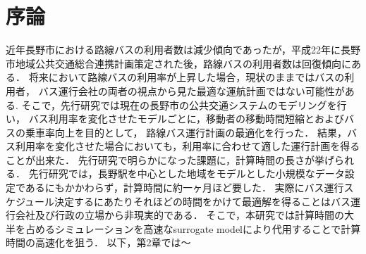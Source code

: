 \documentclass[main]{subfiles}
\begin{document}
\chapter{序論}
近年長野市における路線バスの利用者数は減少傾向であったが，平成22年に長野市地域公共交通総合連携計画策定された後，路線バスの利用者数は回復傾向にある．\cite{naganokeikaku}
将来において路線バスの利用率が上昇した場合，現状のままではバスの利用者，
バス運行会社の両者の視点から見た最適な運航計画ではない可能性がある.
そこで，先行研究では現在の長野市の公共交通システムのモデリングを行い，
バス利用率を変化させたモデルごとに，移動者の移動時間短縮とおよびバスの乗車率向上を目的として，
路線バス運行計画の最適化を行った．\cite{senkoukenkyu}
結果，バス利用率を変化させた場合においても，利用率に合わせて適した運行計画を得ることが出来た．
先行研究で明らかになった課題に，計算時間の長さが挙げられる．
先行研究では，長野駅を中心とした地域をモデルとした小規模なデータ設定であるにもかかわらず，計算時間に約一ヶ月ほど要した．
実際にバス運行スケジュール決定するにあたりそれほどの時間をかけて最適解を得ることはバス運行会社及び行政の立場から非現実的である．
そこで，本研究では計算時間の大半を占めるシミュレーションを高速なsurrogate modelにより代用することで計算時間の高速化を狙う．
以下，第2章では～
\end{document}
